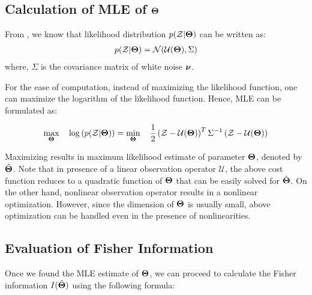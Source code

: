 \documentclass[]{article}
\begin{document}
\subsection*{Calculation of MLE of $\boldsymbol{\Theta}$}\label{sec:mle}
%
From , we know that likelihood distribution $p(\mathcal{Z}|\boldsymbol{\Theta})$ can be written as:
\begin{eqnarray}\label{likhood}
p(\mathcal{Z}|\boldsymbol{\Theta}) = \mathcal{N}({\mathcal{U}}(\boldsymbol{\Theta}),\Sigma)
\end{eqnarray}
where, $\Sigma$ is the covariance matrix of white noise $\boldsymbol{\nu}$.

%

For the ease of computation, instead of maximizing the likelihood function, one can maximize the logarithm of the likelihood function. Hence, MLE can be formulated as:

\begin{equation}\label{mle}
\max_{\boldsymbol{\Theta}}\quad  \log \left( p(\mathcal{Z}|\boldsymbol{\Theta})\right) = \min_{\boldsymbol{\Theta}} \quad \frac{1}{2} \left(\mathcal{Z}-{\mathcal{U}}(\boldsymbol{\Theta})\right)^T\Sigma^{-1}\left(\mathcal{Z}-{\mathcal{U}}(\boldsymbol{\Theta})\right)
\end{equation}

Maximizing  results in maximum likelihood estimate of parameter $\boldsymbol{\Theta}$, denoted by $\hat{\boldsymbol{\Theta}}$. Note that in presence of a linear observation operator $\mathcal{U}$, the above cost function reduces to a quadratic function of $\boldsymbol{\Theta}$ that can be easily solved for $\hat{\boldsymbol{\Theta}}$. On the other hand, nonlinear observation operator results in a nonlinear optimization. However, since the dimension of $\boldsymbol{\Theta}$ is usually small, above optimization can be handled even in the presence of nonlinearities.


\subsection*{Evaluation of Fisher Information}\label{sec:fisher}
Once we found the MLE estimate of $\boldsymbol{\Theta}$, we can proceed to calculate the Fisher information $I(\hat{\boldsymbol{\Theta}})$ using the following formula:
\end{document}
